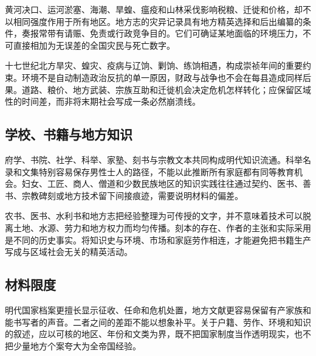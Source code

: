 黄河决口、运河淤塞、海潮、旱蝗、瘟疫和山林采伐影响税粮、迁徙和价格，却不以相同强度作用于所有地区。地方志的灾异记录具有地方精英选择和后出编纂的条件，奏报常带有请赈、免责或行政竞争目的。它们可确证某地面临的环境压力，不可直接相加为无误差的全国灾民与死亡数字。

十七世纪北方旱灾、蝗灾、疫病与辽饷、剿饷、练饷相遇，构成崇祯年间的重要约束。环境不是自动制造政治反抗的单一原因，财政与战争也不会在每县造成同样后果。道路、粮价、地方武装、宗族互助和迁徙机会决定危机怎样转化；应保留区域性的时间差，而非将末期社会写成一条必然崩溃线。

\subsection{学校、书籍与地方知识}

府学、书院、社学、科举、家塾、刻书与宗教文本共同构成明代知识流通。科举名录和文集特别容易保存男性士人的路径，不能以此推断所有家庭都有同等教育机会。妇女、工匠、商人、僧道和少数民族地区的知识实践往往通过契约、医书、善书、宗教碑刻或地方技术留下间接痕迹，需要说明材料的偏差。

农书、医书、水利书和地方志把经验整理为可传授的文字，并不意味着技术可以脱离土地、水源、劳力和地方权力而均匀传播。刻本的存在、作者的主张和实际采用是不同的历史事实。将知识史与环境、市场和家庭劳作相连，才能避免把书籍生产写成与区域社会无关的精英活动。

\subsection{材料限度}

明代国家档案更擅长显示征收、任命和危机处置，地方文献更容易保留有产家族和能书写者的声音。二者之间的差距不能以想象补平。关于户籍、劳作、环境和知识的叙述，应以可核的地区、年份和文类为界，既不把国家制度当作透明现实，也不把少量地方个案夸大为全帝国经验。
